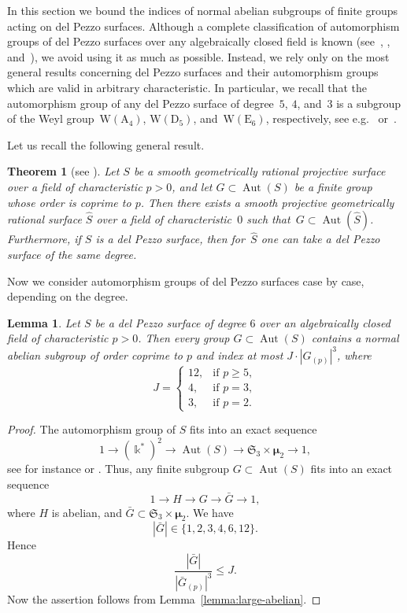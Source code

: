 \documentclass[12pt]{amsart}
\numberwithin{equation}{section}
\newtheorem{lemma}[subsection]{Lemma}
\newtheorem{theorem}[subsection]{Theorem}
\theoremstyle{definition}
\newcommand{\mumu}{\boldsymbol{\mu}}
\newcommand{\WD}{\mathrm{W}(\mathrm{D}_5)}
\newcommand{\WE}{\mathrm{W}(\mathrm{E}_6)}
\DeclareMathOperator{\Aut}{Aut}
\def \ge {\geqslant}
\def \le {\leqslant}
\begin{document}
In this section we bound the indices of normal abelian subgroups of finite
groups acting on del Pezzo surfaces. Although a complete classification
of automorphism groups of del Pezzo surfaces over any algebraically closed field
is known (see~\cite{DD}, \cite{DM-odd}, and~\cite{DM-2}),
we avoid using it as much as possible. Instead, we rely only on the
most general results concerning del Pezzo surfaces and their automorphism groups
which are valid in arbitrary characteristic. In particular, we recall that
the automorphism group of any del Pezzo surface of degree~$5$, $4$, and~$3$ is a subgroup
of the Weyl group~$\mathrm{W}(\mathrm{A}_4)$, $\WD$, and~$\WE$, respectively, see
e.g.~\mbox{\cite[Corollary 8.2.40]{Dolgachev}} or~\mbox{\cite[\S2.2]{DM-odd}}.

Let us recall the following general result.

\begin{theorem}[{see \cite[Th\'eor\`eme 5.1 and Lemme 5.2]{Serre-2008}}]
\label{theorem:Serre-lift}
Let $S$ be a smooth geometrically rational projective
surface over a field of characteristic $p>0$, and let
$G\subset \Aut(S)$ be a finite group whose order is coprime to $p$.
Then there exists a smooth projective geometrically rational surface $\hat{S}$
over a field of characteristic~$0$ such that~\mbox{$G\subset\Aut(\hat{S})$}.
Furthermore, if $S$ is a del Pezzo surface, then for~$\hat{S}$ one can take a del Pezzo
surface of the same degree.
\end{theorem}

Now we consider automorphism groups of del Pezzo surfaces case by case,
depending on the degree.

\begin{lemma}\label{lemma:dP6}
Let $S$ be a del Pezzo surface of degree $6$ over an algebraically closed field
of characteristic $p>0$.
Then every group $G\subset\Aut(S)$ contains a normal abelian subgroup of order coprime to $p$ and index at most
$J\cdot |G_{(p)}|^3$, where
\begin{equation}\label{eq:dP6}
J=\begin{cases}
12, &\text{if\ } p\ge 5,\\
4, &\text{if\ } p=3,\\
3, &\text{if\ } p=2.
\end{cases}
\end{equation}
\end{lemma}

\begin{proof}
The automorphism group of $S$ fits into an exact sequence
$$
1\to (\Bbbk^*)^2\to\Aut(S)\to \mathfrak{S}_3\times\mumu_2\to 1,
$$
see for instance \cite[Theorem~8.4.2]{Dolgachev} or \cite[3.1.4]{DM-odd}.
Thus, any finite subgroup $G\subset\Aut(S)$
fits into an exact sequence
$$
1\to H\to G\to\bar{G}\to 1,
$$
where $H$ is abelian, and $\bar{G}\subset \mathfrak{S}_3\times\mumu_2$.
We have
$$
|\bar{G}|\in\big\{1,2,3,4,6,12\big\}.
$$
Hence
$$
\frac{|\bar{G}|}{|\bar{G}_{(p)}|^3}\le J.
$$
Now the assertion follows from Lemma~\ref{lemma:large-abelian}.
\end{proof}
\end{document}
